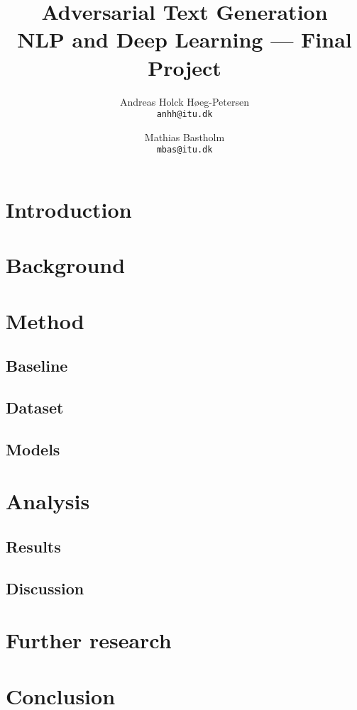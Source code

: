 \documentclass{article}
\title{%
    Adversarial Text Generation\\
    \large NLP and Deep Learning --- Final Project
}
\author{%
    Andreas Holck Høeg-Petersen\\
    \texttt{anhh@itu.dk}
    \and
    Mathias Bastholm\\
    \texttt{mbas@itu.dk}
}
\begin{document}
\maketitle

\begin{abstract}
    \lipsum[1]
\end{abstract}

\section{Introduction}

\lipsum[2]
\lipsum[3]

\section{Background}

\lipsum[4]

\section{Method}


\subsection{Baseline}


\subsection{Dataset}


\subsection{Models}


\section*{Analysis}


\subsection{Results}


\subsection{Discussion}


\section{Further research}


\section{Conclusion}
\end{document}
